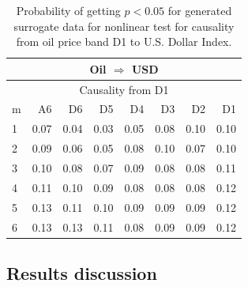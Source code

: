 %
%
\begin{table}[H]
\begin{center}
\begin{tabular}{l|r r r r r r r}
\hline\hline
\multicolumn{8}{c}{Oil $\Rightarrow$ USD}\\
\hline
\multicolumn{8}{c}{Causality from D1}\\
\hline\hline
m & A6 & D6 & D5 & D4 & D3 & D2 & D1 \\
\hline
1 & 0.07 & 0.04 & 0.03 & 0.05 & 0.08 & 0.10 & 0.10 \\
2 & 0.09 & 0.06 & 0.05 & 0.08 & 0.10 & 0.07 & 0.10 \\
3 & 0.10 & 0.08 & 0.07 & 0.09 & 0.08 & 0.08 & 0.11 \\
4 & 0.11 & 0.10 & 0.09 & 0.08 & 0.08 & 0.08 & 0.12 \\
5 & 0.13 & 0.11 & 0.10 & 0.09 & 0.09 & 0.09 & 0.12 \\
6 & 0.13 & 0.13 & 0.11 & 0.08 & 0.09 & 0.09 & 0.12 \\
\hline\hline
\end{tabular}
\caption{Probability of getting $p < 0.05$ for generated surrogate data for nonlinear test for causality from oil price band D1 to U.S. Dollar Index.}
\end{center}
\end{table}

\newpage
\subsection{Results discussion}

